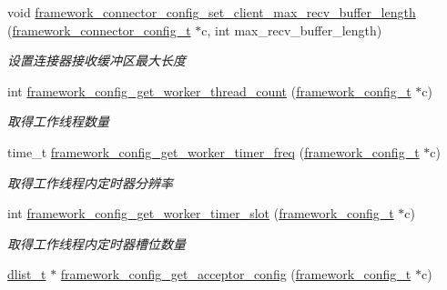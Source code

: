 \begin{DoxyCompactItemize}
void \hyperlink{a00104_ga2b6beeacea30cd3aacb8802bb0323476_ga2b6beeacea30cd3aacb8802bb0323476}{framework\+\_\+connector\+\_\+config\+\_\+set\+\_\+client\+\_\+max\+\_\+recv\+\_\+buffer\+\_\+length} (\hyperlink{a00051_a81253f4c995b97e69be0e67f7a26097f_a81253f4c995b97e69be0e67f7a26097f}{framework\+\_\+connector\+\_\+config\+\_\+t} $\ast$c, int max\+\_\+recv\+\_\+buffer\+\_\+length)
\begin{DoxyCompactList}\small\item\em 设置连接器接收缓冲区最大长度 \end{DoxyCompactList}\item 
int \hyperlink{a00055_aca3f6b57e6c3e601ddf2ecd8d536aa32_aca3f6b57e6c3e601ddf2ecd8d536aa32}{framework\+\_\+config\+\_\+get\+\_\+worker\+\_\+thread\+\_\+count} (\hyperlink{a00051_a55b26efa9e6ee05514d087ba2593a54b_a55b26efa9e6ee05514d087ba2593a54b}{framework\+\_\+config\+\_\+t} $\ast$c)
\begin{DoxyCompactList}\small\item\em 取得工作线程数量 \end{DoxyCompactList}\item 
time\+\_\+t \hyperlink{a00055_a51dc2e8f2c74f8c4418400e867bf18ad_a51dc2e8f2c74f8c4418400e867bf18ad}{framework\+\_\+config\+\_\+get\+\_\+worker\+\_\+timer\+\_\+freq} (\hyperlink{a00051_a55b26efa9e6ee05514d087ba2593a54b_a55b26efa9e6ee05514d087ba2593a54b}{framework\+\_\+config\+\_\+t} $\ast$c)
\begin{DoxyCompactList}\small\item\em 取得工作线程内定时器分辨率 \end{DoxyCompactList}\item 
int \hyperlink{a00055_a644262b6c9e1d4dc33665782f3a27285_a644262b6c9e1d4dc33665782f3a27285}{framework\+\_\+config\+\_\+get\+\_\+worker\+\_\+timer\+\_\+slot} (\hyperlink{a00051_a55b26efa9e6ee05514d087ba2593a54b_a55b26efa9e6ee05514d087ba2593a54b}{framework\+\_\+config\+\_\+t} $\ast$c)
\begin{DoxyCompactList}\small\item\em 取得工作线程内定时器槽位数量 \end{DoxyCompactList}\item 
\hyperlink{a00051_ad6644d67df4b4e3596c1eb12977d1d16_ad6644d67df4b4e3596c1eb12977d1d16}{dlist\+\_\+t} $\ast$ \hyperlink{a00055_a83bfc56ba855d7e63fe8d02826925873_a83bfc56ba855d7e63fe8d02826925873}{framework\+\_\+config\+\_\+get\+\_\+acceptor\+\_\+config} (\hyperlink{a00051_a55b26efa9e6ee05514d087ba2593a54b_a55b26efa9e6ee05514d087ba2593a54b}{framework\+\_\+config\+\_\+t} $\ast$c)

\end{DoxyCompactItemize}
